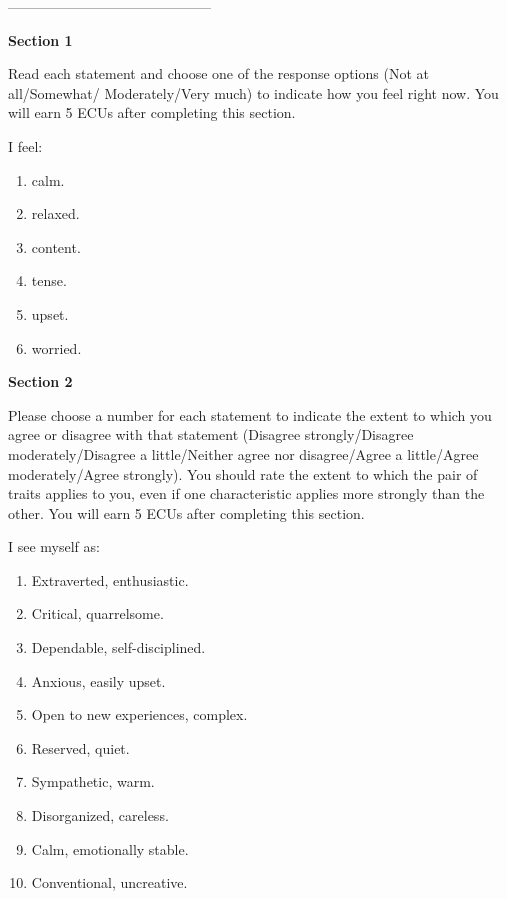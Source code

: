\documentclass[thesis]{uathesis}
\begin{document}
\begin{body}
\begin{appendices}
\vspace{0.1in}
\begin{center}
--------------------------------------------
\end{center}


\noindent\textbf{Section 1}

\medskip

Read each statement and choose one of the response options (Not at all/Somewhat/ Moderately/Very much) to indicate how you feel right now. You will earn 5 ECUs after completing this section.

I feel:
\begin{enumerate}
\item calm.
  \item relaxed.
  \item  content.
  \item  tense.
  \item  upset.
  \item  worried.
\end{enumerate}


\noindent\textbf{Section 2}

\medskip

Please choose a number for each statement to indicate the extent to which you agree or disagree with that statement (Disagree strongly/Disagree moderately/Disagree a little/Neither agree nor disagree/Agree a little/Agree moderately/Agree strongly). You should rate the extent to which the pair of traits applies to you, even if one characteristic applies more strongly than the other. You will earn 5 ECUs after completing this section.



I see myself as:
\begin{enumerate}
\item Extraverted, enthusiastic.
  \item  Critical, quarrelsome.
  \item  Dependable, self-disciplined.
  \item  Anxious, easily upset.
  \item  Open to new experiences, complex.
  \item  Reserved, quiet.
  \item  Sympathetic, warm.
  \item  Disorganized, careless.
  \item  Calm, emotionally stable.
  \item  Conventional, uncreative.
\end{enumerate}



\end{appendices}
\end{body}
\end{document}
